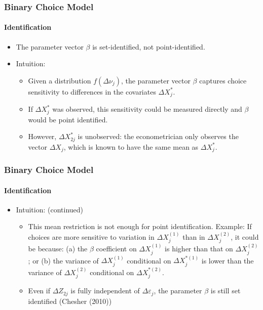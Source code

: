 \begin{frame}
\frametitle{Binary Choice Model}
\framesubtitle{Identification}

\begin{itemize}
	\item The parameter vector $\beta$ is set-identified, not point-identified.
	\item Intuition:
	\begin{itemize}
		\item Given a distribution $f(\Delta\nu_{j})$, the parameter vector $\beta$ captures choice sensitivity to differences in the covariates $\Delta X^{*}_{j}$.
		\item If $\Delta X^{*}_{j}$ was observed, this sensitivity could be measured directly and $\beta$ would be point identified.
		\item However, $\Delta X^{*}_{2j}$ is unobserved: the econometrician only observes the vector $\Delta X_{j}$, which is known to have the same mean as $\Delta X^{*}_{j}$.
	\end{itemize}
\end{itemize}
\end{frame}

\begin{frame}
\frametitle{Binary Choice Model}
\framesubtitle{Identification}

\begin{itemize}
	\item Intuition: (continued)
	\begin{itemize}
		\item This mean restriction is not enough for point identification. Example: If choices are more sensitive to variation in $\Delta X^{(1)}_{j}$ than in $\Delta X^{(2)}_{j}$, it could be because: (a) the $\beta$ coefficient on $\Delta X^{(1)}_{j}$ is higher than that on $\Delta X^{(2)}_{j}$; or (b) the variance of $\Delta X^{(1)}_{j}$ conditional on $\Delta X^{*(1)}_{j}$ is lower than the variance of $\Delta X^{(2)}_{j}$ conditional on $\Delta X^{*(2)}_{j}$.
		\item Even if $\Delta Z_{2j}$ is fully independent of $\Delta\varepsilon_{j}$, the parameter $\beta$ is still set identified (Chesher (2010))
	\end{itemize}
\end{itemize}
\end{frame}

